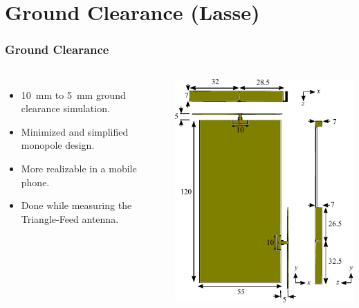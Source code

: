 \section[Ground Clearance]{Ground Clearance (Lasse)}
\def\legendfooter{\scriptsize{Upper: Top antenna. Lower: Side antenna. \textcolor{bb}{Monopole Sim}, \textcolor{gg}{Monopole Meas}, \textcolor{rr}{Triangle-Feed Meas}, Frequency in MHz.}}
\def\emptyline{\textcolor{white}{Empty}}

\begin{frame}[fragile]
  \frametitle{Ground Clearance}
  \begin{columns}[onlytextwidth,t]
      \begin{itemize}
      \item \SI{10}{mm} to \SI{5}{mm} ground clearance simulation.
      \item Minimized and simplified monopole design.
      \item More realizable in a mobile phone.
      \item Done while measuring the Triangle-Feed antenna.
      \end{itemize}
    \begin{center}
      \includegraphics[scale=0.7]{img/Lasse/3d_drawing_mini.pdf}
    \end{center}
  \end{columns}
\end{frame}


